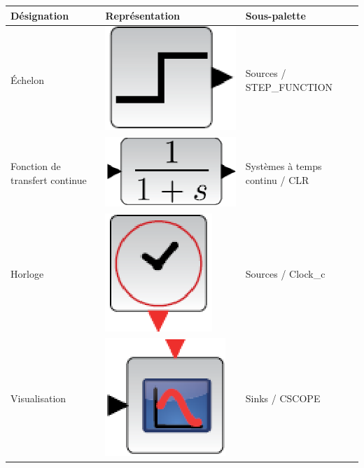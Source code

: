 \begin{table}[!h]
    \centering
    \begin{tabular}{@{}P{4cm}P{6cm}P{4cm}@{}}
    \toprule
    Désignation   & Représentation & Sous-palette \\
    \midrule
    \'Echelon     & \begin{minipage}{6cm}\centering \includegraphics[width=0.25\linewidth]{fig/scilab05.eps}\end{minipage} & Sources / STEP\_FUNCTION \\
    \midrule
    Fonction de transfert continue     & \begin{minipage}{6cm}\centering \includegraphics[width=0.25\linewidth]{fig/scilab06.eps}\end{minipage} & Systèmes à temps continu / CLR \\
    \midrule
    Horloge       & \begin{minipage}{6cm}\centering \includegraphics[width=0.2\linewidth]{fig/scilab07.eps}\end{minipage} & Sources / Clock\_c \\
    \midrule
    Visualisation & \begin{minipage}{6cm}\centering \includegraphics[width=0.25\linewidth]{fig/scilab08.eps}\end{minipage} & Sinks / CSCOPE \\
    \bottomrule
\end{tabular}
\end{table}

